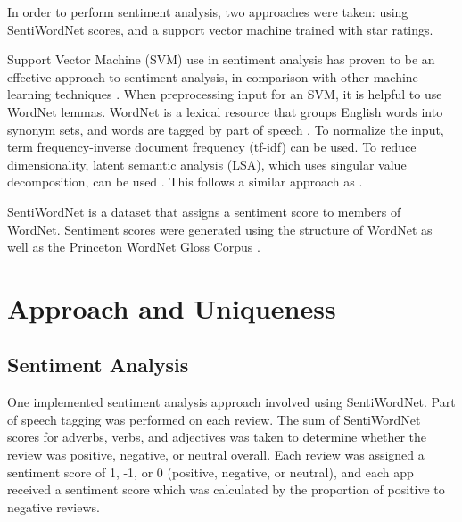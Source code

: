\documentclass{acm_proc_article-sp}
\begin{document}
In order to perform sentiment analysis, two approaches were taken: using SentiWordNet scores, and a support vector machine trained with star ratings.

Support Vector Machine (SVM) use in sentiment analysis has proven to be an effective approach to sentiment analysis, in comparison with other machine learning techniques \cite{Pang02thumbsup}.  When preprocessing input for an SVM, it is helpful to use WordNet lemmas.  WordNet is a lexical resource that groups English words into synonym sets, and words are tagged by part of speech \cite{Miller}.  To normalize the input, term frequency-inverse document frequency (tf-idf) can be used.  To reduce dimensionality, latent semantic analysis (LSA), which uses singular value decomposition, can be used \cite{Deerwester90indexingby}.  This follows a similar approach as \cite{Mullen04sentimentanalysis}.

SentiWordNet is a dataset that assigns a sentiment score to members of WordNet.  Sentiment scores were generated using the structure of WordNet as well as the Princeton WordNet Gloss Corpus \cite{Baccianella10sentiwordnet}.


\section{Approach and Uniqueness}

\subsection{Sentiment Analysis}
One implemented sentiment analysis approach involved using SentiWordNet.  Part of speech tagging was performed on each review. The sum of SentiWordNet scores for adverbs, verbs, and adjectives was taken to determine whether the review was positive, negative, or neutral overall.  Each review was assigned a sentiment score of 1, -1, or 0 (positive, negative, or neutral), and each app received a sentiment score which was calculated by the proportion of positive to negative reviews.
\end{document}
